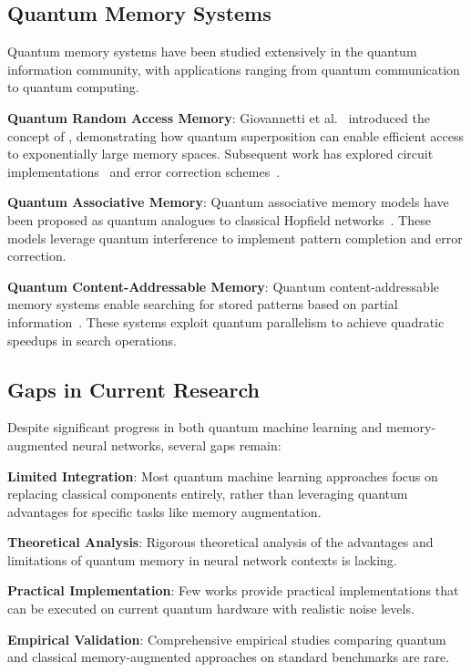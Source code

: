 \subsection{Quantum Memory Systems}

Quantum memory systems have been studied extensively in the quantum information community, with applications ranging from quantum communication to quantum computing.

\textbf{Quantum Random Access Memory}: Giovannetti et al.~\cite{giovannetti2008quantum} introduced the concept of \qram, demonstrating how quantum superposition can enable efficient access to exponentially large memory spaces. Subsequent work has explored circuit implementations~\cite{park2019circuit} and error correction schemes~\cite{arunachalam2015robustness}.

\textbf{Quantum Associative Memory}: Quantum associative memory models have been proposed as quantum analogues to classical Hopfield networks~\cite{ventura1999quantum, perus1996quantum}. These models leverage quantum interference to implement pattern completion and error correction.

\textbf{Quantum Content-Addressable Memory}: Quantum content-addressable memory systems enable searching for stored patterns based on partial information~\cite{trugenberger2001quantum}. These systems exploit quantum parallelism to achieve quadratic speedups in search operations.

\subsection{Gaps in Current Research}

Despite significant progress in both quantum machine learning and memory-augmented neural networks, several gaps remain:

\textbf{Limited Integration}: Most quantum machine learning approaches focus on replacing classical components entirely, rather than leveraging quantum advantages for specific tasks like memory augmentation.

\textbf{Theoretical Analysis}: Rigorous theoretical analysis of the advantages and limitations of quantum memory in neural network contexts is lacking.

\textbf{Practical Implementation}: Few works provide practical implementations that can be executed on current quantum hardware with realistic noise levels.

\textbf{Empirical Validation}: Comprehensive empirical studies comparing quantum and classical memory-augmented approaches on standard benchmarks are rare.

